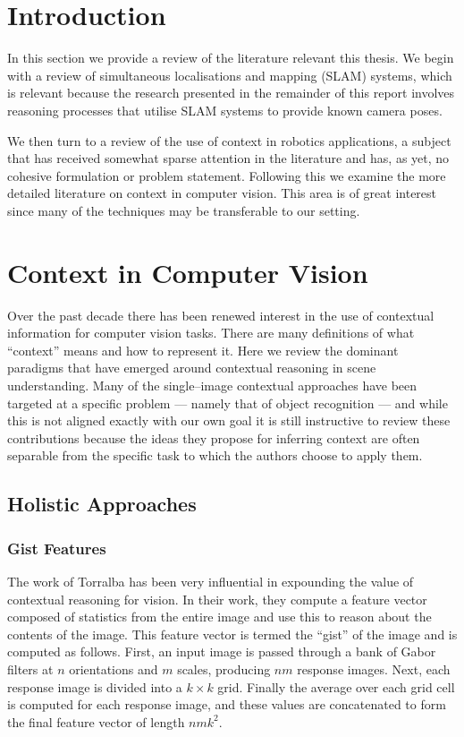 \section{Introduction}
In this section we provide a review of the literature relevant this
thesis. We begin with a review of simultaneous localisations and
mapping (SLAM) systems, which is relevant because the research
presented in the remainder of this report involves reasoning processes
that utilise SLAM systems to provide known camera poses.

We then turn to a review of the use of context in robotics
applications, a subject that has received somewhat sparse attention in
the literature and has, as yet, no cohesive formulation or problem
statement. Following this we examine the more detailed literature on
context in computer vision. This area is of great interest since many
of the techniques may be transferable to our setting.


\section{Context in Computer Vision}
Over the past decade there has been renewed interest in the use of
contextual information for computer vision tasks. There are many
definitions of what ``context'' means and how to represent it. Here we
review the dominant paradigms that have emerged around contextual
reasoning in scene understanding. Many of the single--image contextual
approaches have been targeted at a specific problem --- namely that of
object recognition --- and while this is not aligned exactly with our
own goal it is still instructive to review these contributions because
the ideas they propose for inferring context are often separable from
the specific task to which the authors choose to apply them.

\subsection{Holistic Approaches}

\subsubsection{Gist Features}
The work of Torralba \etal \cite{Torralba03} has been very influential
in expounding the value of contextual reasoning for vision. In their
work, they compute a feature vector composed of statistics from the
entire image and use this to reason about the contents of the
image. This feature vector is termed the ``gist'' of the image and is
computed as follows. First, an input image is passed through a bank of
Gabor filters at $n$ orientations and $m$ scales, producing $nm$
response images. Next, each response image is divided into a $k \times
k$ grid. Finally the average over each grid cell is computed for each
response image, and these values are concatenated to form the final
feature vector of length $nmk^2$.

